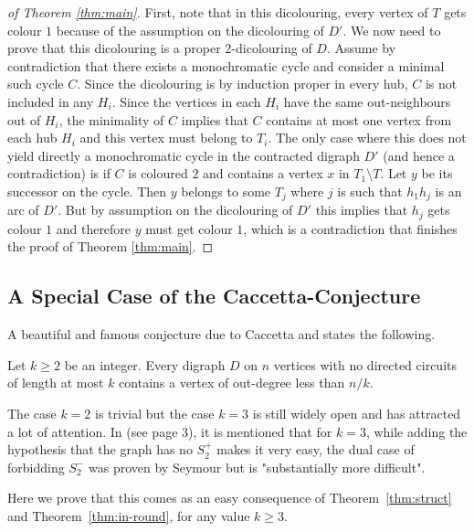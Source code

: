 \begin{proof}[of Theorem \ref{thm:main}]
First, note that in this dicolouring, every vertex of $T$ gets colour $1$ because of the assumption on the dicolouring of $D'$. We now need to prove  that this dicolouring is a proper  $2$-dicolouring of $D$. Assume by contradiction that there exists a monochromatic cycle and consider a minimal such cycle $C$. Since the dicolouring is by induction proper in every hub, $C$ is not included in any $H_{i}$. Since the vertices in each $H_{i}$ have the same out-neighbours out of $H_{i}$, the minimality of $C$ implies that $C$ contains at most one vertex from each hub $H_{i}$ and this vertex must belong to $T_{i}$. The only case where this does not yield directly a monochromatic cycle in the contracted digraph $D'$ (and hence a contradiction) is if $C$ is coloured $2$ and contains a vertex $x$ in $T_{1}\setminus T$. Let $y$ be its successor on the cycle. Then $y$ belongs to some $T_{j}$ where $j$ is such that $h_{1}h_{j}$ is an arc of $D'$. But by assumption on the dicolouring of $D'$ this implies that $h_{j}$ gets colour $1$ and therefore $y$ must get colour $1$, which is a contradiction that finishes the proof of Theorem \ref{thm:main}.


\end{proof}





\subsection{A Special Case of the Caccetta-\Hag Conjecture}\label{sec:ch}
A beautiful and famous conjecture due to Caccetta and \Hag states the following. 
\begin{conjecture}
Let $k\geq 2$ be an integer. Every digraph $D$ on $n$ vertices with no directed circuits of length at most $k$ contains a vertex of out-degree less than $n/k$.
\end{conjecture}
The case $k=2$ is trivial but the case $k=3$ is still widely open and has attracted a lot of attention. In \cite{R13} (see page 3), it is mentioned that for $k=3$, while adding the hypothesis that the graph has no $S^+_2$ makes it very easy, the dual case of forbidding $S^-_2$ was proven by Seymour but is "substantially more difficult". 

Here we prove that this comes as an easy consequence of Theorem~\ref{thm:struct} and Theorem~\ref{thm:in-round}, for any value $k\geq 3$.


